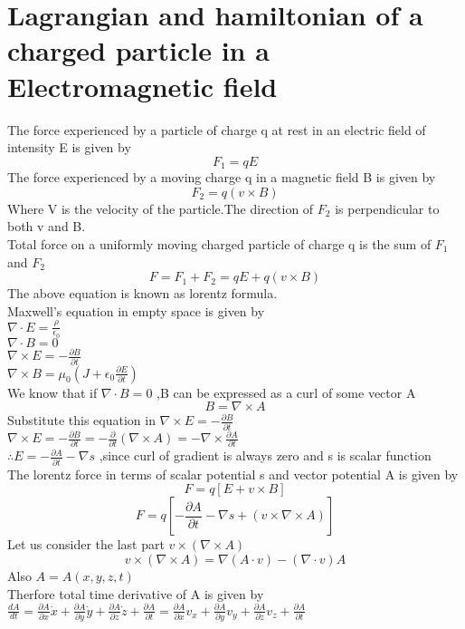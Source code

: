 \section{Lagrangian and hamiltonian of a charged particle in a Electromagnetic field}
The force experienced by a particle of charge q at rest in an electric field of intensity E is given by
$$F_1=qE$$
The force experienced by a moving charge q in a magnetic field B is given by\\
$$F_2=q(v\times B)$$
Where V  is the velocity of the particle.The direction of $F_2$ is perpendicular to both v and B.\\
Total force on a uniformly moving charged particle of charge q is the sum of $F_1$ and $F_2$\\
$$F=F_1+F_2=qE+q(v\times B)$$
The above equation is known as lorentz formula.\\
Maxwell's equation in empty space is given by\\
$\nabla \cdot E=\frac{\rho}{\epsilon_0}$\\
$\nabla \cdot B=0$\\
$\nabla \times E=-\frac{\partial B}{\partial t}$\\
$\nabla \times B=\mu_0(J+\epsilon_0\frac{\partial E}{\partial t})$\\
We know that if $\nabla \cdot B=0$ ,B can be expressed as a curl of some vector A\\
$$B=\nabla \times A$$
Substitute this equation in $\nabla \times E=-\frac{\partial B}{\partial t}$\\
$\nabla \times E=-\frac{\partial B}{\partial t}=-\frac{\partial}{\partial t}(\nabla \times A)=-\nabla \times \frac{\partial A}{\partial t}$\\
$\therefore E=-\frac{\partial A}{\partial t}-\nabla s$ ,since curl of gradient is always zero and s is  scalar function\\
The lorentz force in terms of scalar potential s and vector potential A is given by\\
$$F=q\left[ E+v\times B\right] $$
$$F=q\left[ -\frac{\partial A}{\partial t}-\nabla s+(v\times \nabla \times A)\right] $$
Let us consider the last part $v\times(\nabla \times A)$\\
$$v\times(\nabla \times A)=\nabla (A\cdot v)-(\nabla \cdot v)A$$
Also $A=A(x,y,z,t)$\\
Therfore total time derivative of A is given by\\
$\frac{dA}{dt}=\frac{\partial A}{\partial x} \dot{x}+\frac{\partial A}{\partial y} \dot{y}+\frac{\partial A}{\partial z} \dot{z}+\frac{\partial A}{\partial t}=\frac{\partial A}{\partial x} v_x+\frac{\partial A}{\partial y} v_y+\frac{\partial A}{\partial z} v_z+\frac{\partial A}{\partial t}$\\
